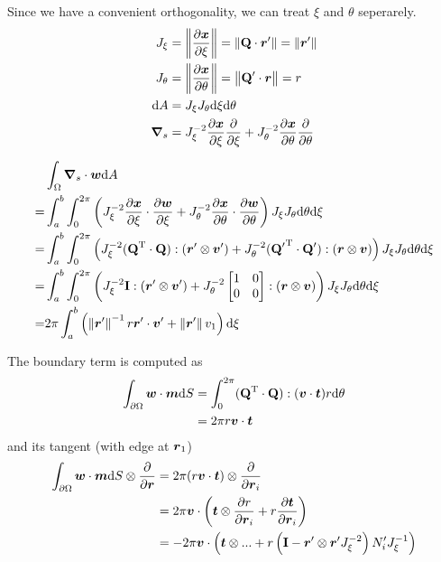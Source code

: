\documentclass[a4paper,11pt]{article}
\renewcommand{\to}[1]{\text{\boldmath $#1$}} %
\newcommand{\ts}[1]{\text{\boldmath $\mathrm{#1}$}} %
\newcommand{\intd}[1]{\mathrm{d}#1}
\newcommand{\pderiv}[2]{\frac{\partial#1}{\partial#2}}
\newcommand{\norm}[1]{\left\lVert{#1}\right\rVert}
\newcommand{\T}{\mathrm{T}}
\begin{document}
Since we have a convenient orthogonality, we can treat $\xi$ and $\theta$ seperarely.
\begin{align}
 J_\xi &= \norm{\pderiv{\to x}{\xi}} = \norm{\ts Q \cdot \to r'} = \norm{\to r'}\\
 J_\theta &= \norm{\pderiv{\to x}{\theta}} = \norm{\ts Q' \cdot \to r} = r \\
 \intd A &= J_\xi J_\theta \intd \xi \intd \theta \\
 \to\nabla_s &= J_\xi^{-2} \pderiv{\to x}{\xi}\pderiv{}{\xi} + J_\theta^{-2} \pderiv{\to x}{\theta}\pderiv{}{\theta}
\end{align}

\begin{align}
 &\int_\Omega\to \nabla_s\cdot\to w\intd A\\
=&\int_a^b\int_0^{2\pi}\left( J_\xi^{-2} \pderiv{\to x}{\xi}\cdot\pderiv{\to w}{\xi} +
                              J_\theta^{-2} \pderiv{\to x}{\theta}\cdot\pderiv{\to w}{\theta}
  \right) J_\xi J_\theta \intd \theta \intd \xi\\
=&\int_a^b\int_0^{2\pi}\left(
	  J_\xi^{-2} (\ts Q^\T\cdot\ts Q):(\to r'\otimes \to v') +
	  J_\theta^{-2} ({\ts Q'}^\T\cdot\ts Q'):(\to r\otimes\to v)
  \right) J_\xi J_\theta \intd \theta \intd \xi\\
=&\int_a^b\int_0^{2\pi}\left(
	  J_\xi^{-2} \ts I :(\to r'\otimes \to v') +
	  J_\theta^{-2} \begin{bmatrix}1&0\\0&0\end{bmatrix}:(\to r \otimes \to v)
  \right) J_\xi J_\theta \intd \theta \intd \xi\\
=&2\pi\int_a^b\left(
	  \norm{\to r'}^{-1} r \to r' \cdot \to v' +
	  \norm{\to r'} v_1
  \right) \intd \xi
\end{align}

The boundary term is computed as
\begin{align}
 \int_{\partial\Omega} \to w\cdot\to m\intd S &= \int_0^{2\pi} (\ts Q^\T\cdot \ts Q):(\to v\cdot\to t) r \intd \theta\\
  &= 2\pi r \to v \cdot \to t
\end{align}
and its tangent (with edge at $\to r_1$)
\begin{align}
 \int_{\partial\Omega} \to w\cdot\to m\intd S \otimes \pderiv{}{\to r} &= 2\pi (r \to v \cdot \to t)\otimes \pderiv{}{\to r_i}\\
  &= 2 \pi \to v\cdot\left(\to t\otimes\pderiv{r}{\to r_i} + r \pderiv{\to t}{\to r_i}\right)\\
  &= -2 \pi \to v\cdot\left(\to t\otimes ... + r \left(\ts I-\to r'\otimes\to r' J_\xi^{-2}\right)N_i' J_\xi^{-1}\right)
\end{align}
\end{document}
